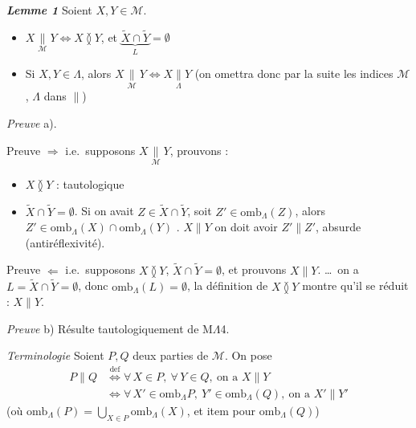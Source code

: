 \documentclass[11pt,a4paper]{article}
\begin{document}
\textbf{\emph{Lemme 1}} Soient $X, Y \in \mathcal{M}$.
\begin{itemize}
  \item[a)] $X \underset{\mathcal{M}}{\parallel} Y \iff X \between Y$, et $\underbrace{\widetilde{X} \cap \widetilde{Y}}_{L} = \emptyset$
  \item[b)] Si $X, Y \in \Lambda$, alors $X \underset{\mathcal{M}}{\parallel} Y \iff X \underset{\Lambda}{\parallel} Y$ (on omettra donc par la suite les indices $\mathcal{M}$, $\Lambda$ dans $\parallel$)
\end{itemize}

\emph{Preuve} a). 

Preuve $\Longrightarrow$ i.e.\ supposons $X \underset{\mathcal{M}}{\parallel} Y$, prouvons :
\begin{itemize}
  \item[1°)] $X \between Y$ : tautologique
  \item[2°)] $\widetilde{X} \cap \widetilde{Y} = \emptyset$. Si on avait $Z \in \widetilde{X} \cap \widetilde{Y}$, soit $Z' \in \mathrm{omb}_{\Lambda}(Z)$, alors $Z' \in \mathrm{omb}_{\Lambda}(X) \cap \mathrm{omb}_{\Lambda}(Y)$ . $X \parallel Y$ on doit avoir $Z' \parallel Z'$, absurde (antiréflexivité).
\end{itemize}

Preuve $\Longleftarrow$ i.e.\ supposons $X \between Y$, $\widetilde{X} \cap \widetilde{Y} = \emptyset$, et prouvons $X \parallel Y$.     \ldots\ on a $L = \widetilde{X} \cap \widetilde{Y} = \emptyset$,  donc $\mathrm{omb}_{\Lambda}(L) = \emptyset$,  la définition de $X \between Y$ montre qu'il se réduit : $X \parallel Y$.

\emph{Preuve} b) Résulte tautologiquement de M$\Lambda$4.

\emph{Terminologie} Soient $P, Q$ deux parties de $\mathcal{M}$. On pose
\[
  \begin{aligned}
    P \parallel Q &\overset{\mathrm{def}}{\iff} \forall\, X \in P,\ \forall\, Y \in Q,\ \text{on a } X \parallel Y \\
    &\iff \forall\, X' \in \mathrm{omb}_{\Lambda} P,\ Y' \in \mathrm{omb}_{\Lambda}(Q),\ \text{on a } X' \parallel Y'
  \end{aligned}
\]
(où $\mathrm{omb}_{\Lambda}(P) = \bigcup_{X \in P} \mathrm{omb}_{\Lambda}(X)$, et item pour $\mathrm{omb}_{\Lambda}(Q)$)
\end{document}
